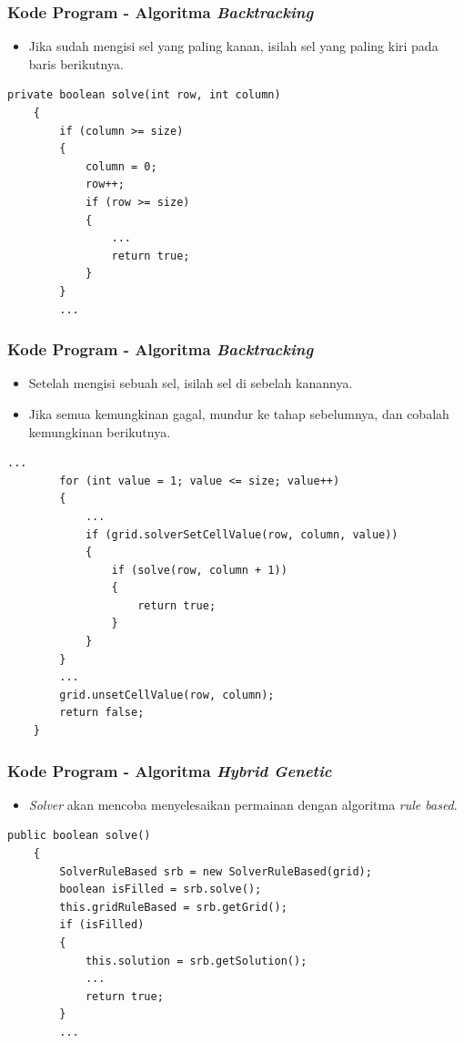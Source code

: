 \documentclass{beamer}
\begin{document}

\begin{frame}[fragile]
\frametitle{Kode Program - Algoritma \textit{Backtracking}}
\begin{itemize}
\item Jika sudah mengisi sel yang paling kanan, isilah sel yang paling kiri pada baris berikutnya.
\end{itemize}
\begin{lstlisting}[basicstyle=\tiny]
    private boolean solve(int row, int column)
    {
        if (column >= size)
        {
            column = 0;
            row++;
            if (row >= size)
            {
                ...
                return true;
            }
        }
        ...
\end{lstlisting}
\end{frame}


\begin{frame}[fragile]
\frametitle{Kode Program - Algoritma \textit{Backtracking}}
\begin{itemize}
\item Setelah mengisi sebuah sel, isilah sel di sebelah kanannya.
\item Jika semua kemungkinan gagal, mundur ke tahap sebelumnya, dan cobalah kemungkinan berikutnya.
\end{itemize}
\begin{lstlisting}[basicstyle=\tiny]
        ...
        for (int value = 1; value <= size; value++)
        {
            ...
            if (grid.solverSetCellValue(row, column, value))
            {
                if (solve(row, column + 1))
                {
                    return true;
                }
            }
        }
        ...
        grid.unsetCellValue(row, column);
        return false;
    }
\end{lstlisting}
\end{frame}


\begin{frame}[fragile]
\frametitle{Kode Program - Algoritma \textit{Hybrid Genetic}}
\begin{itemize}
\item \textit{Solver} akan mencoba menyelesaikan permainan dengan algoritma \textit{rule based}.
\end{itemize}
\begin{lstlisting}[basicstyle=\tiny]
    public boolean solve()
    {
        SolverRuleBased srb = new SolverRuleBased(grid);
        boolean isFilled = srb.solve();
        this.gridRuleBased = srb.getGrid();
        if (isFilled)
        {
            this.solution = srb.getSolution();
            ...
            return true;
        }
        ...
\end{lstlisting}
\end{frame}
\end{document}
